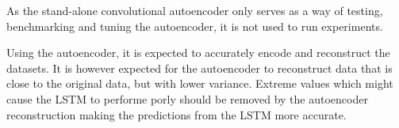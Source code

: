 As the stand-alone convolutional autoencoder only serves as a way of testing, benchmarking and tuning the autoencoder,
it is not used to run experiments.


Using the autoencoder, it is expected to accurately encode and reconstruct the datasets.
It is however expected for the autoencoder to reconstruct data that is close to the original data,
but with lower variance.
Extreme values which might cause the LSTM to performe porly should be removed by the autoencoder reconstruction
making the predictions from the LSTM more accurate.



